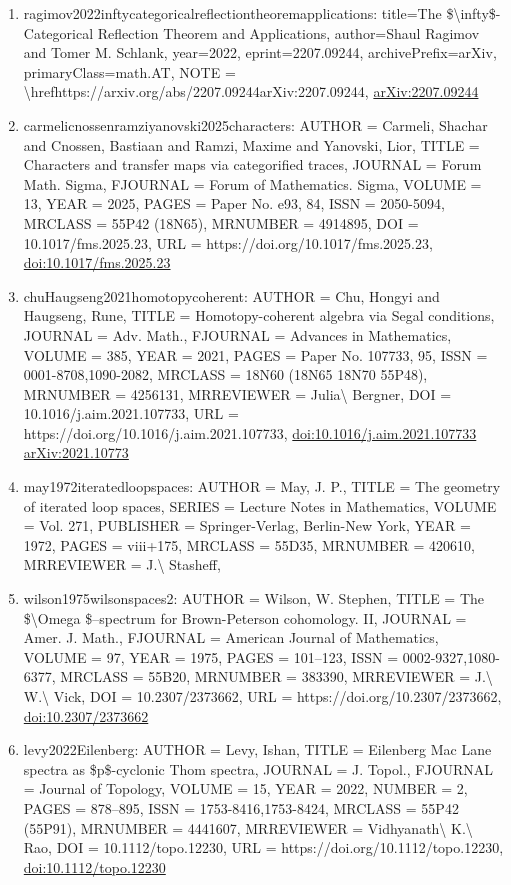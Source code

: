 \documentclass[11pt]{article}
\begin{document}
\begin{enumerate}[leftmargin=*]
  \item ragimov2022inftycategoricalreflectiontheoremapplications: title=The \$\textbackslash{}infty\$-Categorical Reflection Theorem and Applications, author=Shaul Ragimov and Tomer M. Schlank, year=2022, eprint=2207.09244, archivePrefix=arXiv, primaryClass=math.AT, NOTE = \textbackslash{}hrefhttps://arxiv.org/abs/2207.09244arXiv:2207.09244, \href{https://arxiv.org/abs/2207.09244}{arXiv:2207.09244}
  \item carmelicnossenramziyanovski2025characters: AUTHOR = Carmeli, Shachar and Cnossen, Bastiaan and Ramzi, Maxime and Yanovski, Lior, TITLE = Characters and transfer maps via categorified traces, JOURNAL = Forum Math. Sigma, FJOURNAL = Forum of Mathematics. Sigma, VOLUME = 13, YEAR = 2025, PAGES = Paper No. e93, 84, ISSN = 2050-5094, MRCLASS = 55P42 (18N65), MRNUMBER = 4914895, DOI = 10.1017/fms.2025.23, URL = https://doi.org/10.1017/fms.2025.23, \href{https://doi.org/10.1017/fms.2025.23}{doi:10.1017/fms.2025.23}
  \item chuHaugseng2021homotopycoherent: AUTHOR = Chu, Hongyi and Haugseng, Rune, TITLE = Homotopy-coherent algebra via Segal conditions, JOURNAL = Adv. Math., FJOURNAL = Advances in Mathematics, VOLUME = 385, YEAR = 2021, PAGES = Paper No. 107733, 95, ISSN = 0001-8708,1090-2082, MRCLASS = 18N60 (18N65 18N70 55P48), MRNUMBER = 4256131, MRREVIEWER = Julia\textbackslash{} Bergner, DOI = 10.1016/j.aim.2021.107733, URL = https://doi.org/10.1016/j.aim.2021.107733, \href{https://doi.org/10.1016/j.aim.2021.107733}{doi:10.1016/j.aim.2021.107733} \href{https://arxiv.org/abs/2021.10773}{arXiv:2021.10773}
  \item may1972iteratedloopspaces: AUTHOR = May, J. P., TITLE = The geometry of iterated loop spaces, SERIES = Lecture Notes in Mathematics, VOLUME = Vol. 271, PUBLISHER = Springer-Verlag, Berlin-New York, YEAR = 1972, PAGES = viii+175, MRCLASS = 55D35, MRNUMBER = 420610, MRREVIEWER = J.\textbackslash{} Stasheff,
  \item wilson1975wilsonspaces2: AUTHOR = Wilson, W. Stephen, TITLE = The \$\textbackslash{}Omega \$--spectrum for Brown-Peterson cohomology. II, JOURNAL = Amer. J. Math., FJOURNAL = American Journal of Mathematics, VOLUME = 97, YEAR = 1975, PAGES = 101--123, ISSN = 0002-9327,1080-6377, MRCLASS = 55B20, MRNUMBER = 383390, MRREVIEWER = J.\textbackslash{} W.\textbackslash{} Vick, DOI = 10.2307/2373662, URL = https://doi.org/10.2307/2373662, \href{https://doi.org/10.2307/2373662}{doi:10.2307/2373662}
  \item levy2022Eilenberg: AUTHOR = Levy, Ishan, TITLE = Eilenberg Mac Lane spectra as \$p\$-cyclonic Thom spectra, JOURNAL = J. Topol., FJOURNAL = Journal of Topology, VOLUME = 15, YEAR = 2022, NUMBER = 2, PAGES = 878--895, ISSN = 1753-8416,1753-8424, MRCLASS = 55P42 (55P91), MRNUMBER = 4441607, MRREVIEWER = Vidhyanath\textbackslash{} K.\textbackslash{} Rao, DOI = 10.1112/topo.12230, URL = https://doi.org/10.1112/topo.12230, \href{https://doi.org/10.1112/topo.12230}{doi:10.1112/topo.12230}

\end{enumerate}
\end{document}
